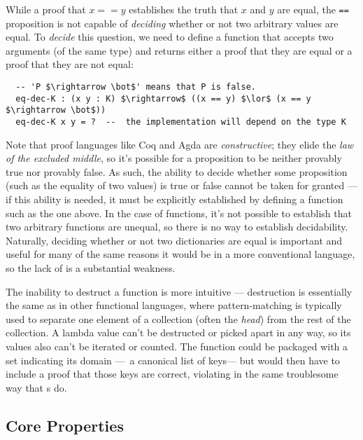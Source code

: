 
While a proof that $x == y$ establishes the truth that $x$ and $y$ are equal, the \texttt{==} proposition is not capable of \emph{deciding} whether or not two arbitrary values are equal.
%
To \emph{decide} this question, we need to define a function that accepts two arguments (of the same type) and returns either a proof that they are equal or a proof that they are not equal:
\begin{lstlisting}
  -- 'P $\rightarrow \bot$' means that P is false.
  eq-dec-K : (x y : K) $\rightarrow$ ((x == y) $\lor$ (x == y $\rightarrow \bot$))
  eq-dec-K x y = ?  --  the implementation will depend on the type K
\end{lstlisting}

Note that proof languages like Coq and Agda are \emph{constructive}; they elide the \emph{law of the excluded middle}, so it's possible for a proposition to be neither provably true nor provably false.
%
As such, the ability to decide whether some proposition (such as the equality of two values) is true or false cannot be taken for granted --- if this ability is needed, it must be explicitly established by defining a function such as the one above.
%
In the case of functions, it's not possible to establish that two arbitrary functions are unequal, so there is no way to establish decidability.
%
Naturally, deciding whether or not two dictionaries are equal is important and useful for many of the same reasons it would be in a more conventional language, so the lack of \DecidableEq{} is a substantial weakness.


The inability to destruct a function is more intuitive --- destruction is essentially the same as in other functional languages, where pattern-matching is typically used to separate one element of a collection (often the \emph{head}) from the rest of the collection.
%
A lambda value can't be destructed or picked apart in any way, so its values also can't be iterated or counted.
%
The function could be packaged with a set indicating its domain ---\ie{}~a canonical list of keys--- but would then have to include a proof that those keys are correct, violating \SemTot{} in the same troublesome way that \cal{}s do.

\subsection{Core Properties}
\label{sec:Introduction:props}

